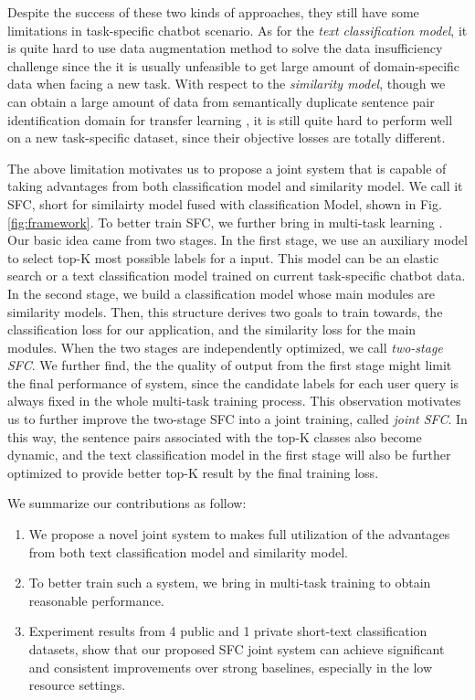 Despite  the  success  of  these two kinds of approaches, they still have some
limitations   in   task-specific  chatbot  scenario.  As  for  the  \emph{text
classification  model},  it  is  quite hard to use data augmentation method to
solve  the  data insufficiency challenge since the it is usually unfeasible to
get  large amount of domain-specific data when facing a new task. With respect
to  the  \emph{similarity model}, though we can obtain a large amount of data
from semantically  duplicate  sentence  pair identification domain for transfer
learning  \cite{sun2019fine},  it  is  still  quite  hard  to  perform well on
a new task-specific dataset,  since their objective losses are totally different. 

The  above  limitation motivates us to propose a joint system that is capable of
taking  advantages  from both classification model and similarity model. We call
it  SFC,  short  for  similairty model fused with classification Model, shown in
Fig.  \ref{fig:framework}.  To  better train SFC, we further bring in multi-task
learning   \cite{caruana1993multitask,collobert2008unified,  liu2019multi}.  Our
basic  idea  came from two stages. In the first stage, we use an auxiliary model
to  select  top-K most possible labels for a input. This model can be an elastic
search  \cite{divya2013elasticsearch}  or a text classification model trained on
current   task-specific   chatbot   data.  In  the  second  stage,  we  build  a
classification  model  whose  main  modules  are  similarity  models. Then, this
structure  derives  two  goals to train towards, the classification loss for our
application,  and  the similarity loss for the main modules. When the two stages
are  independently optimized, we call \emph{two-stage SFC}. We further find, the
the  quality of output from the first stage might limit the final performance of
system,  since  the  candidate labels for each user query is always fixed in the
whole  multi-task  training  process.  This  observation motivates us to further
improve  the  two-stage  SFC  into a joint training, called \emph{joint SFC}. In
this  way,  the  sentence  pairs  associated  with the top-K classes also become
dynamic,  and  the  text  classification  model  in the first stage will also be
further optimized to provide better top-K result by the final training loss.


We summarize our contributions as follow:
\begin{enumerate}
  \item We propose a novel joint system to makes full utilization of
  the advantages from both text classification model and similarity model.

  \item To  better  train such a system, we bring in multi-task training to obtain
  reasonable performance.

  \item Experiment  results  from 4 public and 1 private short-text classification
  datasets,  show  that  our  proposed  SFC joint system can achieve significant
  and consistent improvements over strong baselines, especially in the low resource settings.
\end{enumerate}

